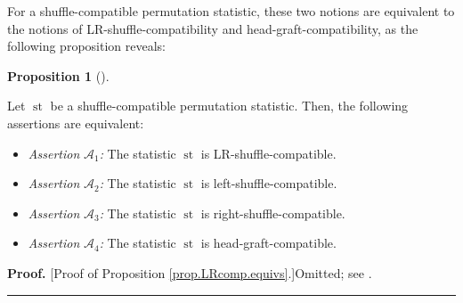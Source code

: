 \documentclass[numbers=enddot,12pt,final,onecolumn,notitlepage]{scrartcl}%
\theoremstyle{definition}
\newtheorem{prop}[theo]{Proposition}
\newenvironment{proposition}[1][]
{\begin{prop}[#1]\begin{leftbar}}
{\end{leftbar}\end{prop}}
\newenvironment{proof}[1][Proof]{\noindent\textbf{#1.} }{\ \rule{0.5em}{0.5em}}
\newenvironment{vershort}{}{}
\begin{document}
For a shuffle-compatible permutation statistic, these two notions are
equivalent to the notions of LR-shuffle-compatibility and
head-graft-compatibility, as the following proposition reveals:

\begin{proposition}
\label{prop.LRcomp.equivs}Let $\operatorname*{st}$ be a shuffle-compatible
permutation statistic. Then, the following assertions are equivalent:

\begin{itemize}
\item \textit{Assertion }$\mathcal{A}_{1}$\textit{:} The statistic
$\operatorname*{st}$ is LR-shuffle-compatible.

\item \textit{Assertion }$\mathcal{A}_{2}$\textit{:} The statistic
$\operatorname*{st}$ is left-shuffle-compatible.

\item \textit{Assertion }$\mathcal{A}_{3}$\textit{:} The statistic
$\operatorname*{st}$ is right-shuffle-compatible.

\item \textit{Assertion }$\mathcal{A}_{4}$\textit{:} The statistic
$\operatorname*{st}$ is head-graft-compatible.
\end{itemize}
\end{proposition}

\begin{vershort}
\begin{proof}
[Proof of Proposition \ref{prop.LRcomp.equivs}.]Omitted; see \cite{verlong}.
\end{proof}
\end{vershort}
\end{document}
